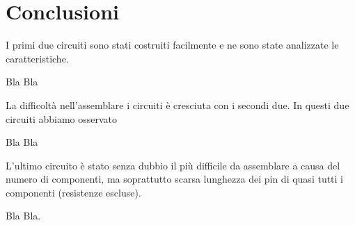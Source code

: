 \section{Conclusioni}

I primi due circuiti sono stati costruiti facilmente e ne sono state analizzate le caratteristiche.

Bla Bla

La difficoltà nell'assemblare i circuiti è cresciuta con i secondi due. In questi due circuiti abbiamo osservato

Bla Bla

L'ultimo circuito è stato senza dubbio il più difficile da assemblare a causa del numero di componenti, ma soprattutto scarsa lunghezza dei pin di quasi tutti i componenti (resistenze escluse).

Bla Bla.